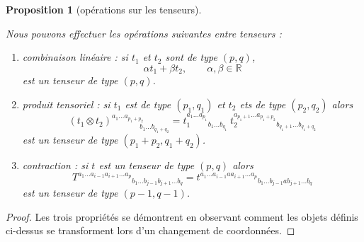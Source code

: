 \documentclass[a4paper,11pt]{report}
\theoremstyle{definition}
\theoremstyle{plain}
\newtheorem{prop}[thm]{Proposition}
\theoremstyle{definition}
\theoremstyle{remark}
\begin{document}
                \begin{prop}[opérations sur les tenseurs]\begin{leftbar}
                    Nous pouvons effectuer les opérations suivantes entre tenseurs :
                    \begin{enumerate}[label = \textit{\roman*)}]
                        \item combinaison linéaire : si $t_1$ et $t_2$ sont de type $(p,q)$,
                        \begin{equation}
                            \alpha t_1 + \beta t_2, \qquad\alpha,\beta\in\mathbb{R}
                        \end{equation} 
                        est un tenseur de type $(p,q)$.
                        \item produit tensoriel : si $t_1$ est de type $(p_1,q_1)$ et $t_2$ ets de type $(p_2,q_2)$ alors
                        \begin{equation}
                            (t_1\otimes t_2)_{\qquad\qquad b_1\dots b_{q_1+q_2}}^{a_1\dots a_{p_1+p_2}} =
                            t_1^{a_1\dots a_{p_1}}{}_{b_1\dots b_{q_1}}~t_2^{a_{p_1+1}\dots a_{p_1+p_2}}{}_{b_{q_1+1}\dots b_{q_1+q_2}}
                        \end{equation}
                        est un tenseur de type $(p_1+p_2,q_1+q_2)$.
                        \item contraction : si $t$ est un tenseur de type $(p,q)$ alors
                        \begin{equation}
                            T^{a_1\dots a_{i-1}a_{i+1}\dots a_p}{}_{b_1\dots b_{j-1}b_{j+1}\dots b_q} = t^{a_1\dots a_{i-1} a a_{i+1}\dots a_p}{}_{b_1\dots b_{j-1} a b_{j+1}\dots b_q}
                        \end{equation}
                        est un tenseur de type $(p-1,q-1)$.
                    \end{enumerate}
                \end{leftbar}\end{prop}
                
                \begin{proof}
                    Les trois propriétés se démontrent en observant comment les objets définis ci-dessus se transforment lors d'un changement de coordonnées.
                \end{proof}
                
\end{document}
